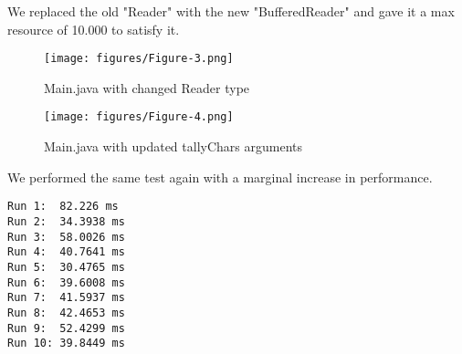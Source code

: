 We replaced the old "Reader" with the new "BufferedReader" and gave it a max resource of 10.000 to satisfy it.  
\begin{figure}[h]
    \caption{Main.java with changed Reader type}
    \texttt{[image: figures/Figure-3.png]}
    \label{fig:flame-chart-unchanged}
\end{figure}

\begin{figure}[h]
    \caption{Main.java with updated tallyChars arguments}
    \texttt{[image: figures/Figure-4.png]}
    \label{fig:flame-chart-unchanged}
\end{figure}

We performed the same test again with a marginal increase in performance.
\begin{lstlisting}[]
Run 1:  82.226 ms
Run 2:  34.3938 ms
Run 3:  58.0026 ms
Run 4:  40.7641 ms
Run 5:  30.4765 ms
Run 6:  39.6008 ms
Run 7:  41.5937 ms
Run 8:  42.4653 ms
Run 9:  52.4299 ms
Run 10: 39.8449 ms    
    \end{lstlisting}